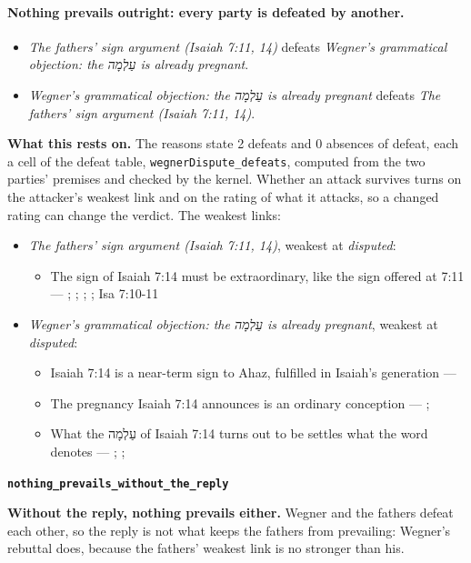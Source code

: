 \documentclass[11pt]{article}
\begin{document}
\paragraph{Nothing prevails outright: every party is defeated by another.}
\begin{itemize}
\item \emph{The fathers' sign argument (Isaiah 7:11, 14)} defeats \emph{Wegner's grammatical objection: the עַלְמָה is already pregnant}.
\item \emph{Wegner's grammatical objection: the עַלְמָה is already pregnant} defeats \emph{The fathers' sign argument (Isaiah 7:11, 14)}.
\end{itemize}
\par\noindent\textbf{What this rests on.} The reasons state 2 defeats and 0 absences of defeat, each a cell of the defeat table, \texttt{wegner\allowbreak{}Dispute\_\allowbreak{}defeats}, computed from the two parties' premises and checked by the kernel. Whether an attack survives turns on the attacker's weakest link and on the rating of what it attacks, so a changed rating can change the verdict. The weakest links:
\begin{itemize}
\item \emph{The fathers' sign argument (Isaiah 7:11, 14)}, weakest at \emph{disputed}:
\begin{itemize}
\item The sign of Isaiah 7:14 must be extraordinary, like the sign offered at 7:11 --- \cite[I.35]{origen-against-celsus-248}; \cite[84]{justin-dialogue-with-trypho-160}; \cite[III.21.6]{irenaeus-against-heresies-180}; \cite[474]{postell-isaiah-messianic-2025}; Isa 7:10-11
\end{itemize}
\item \emph{Wegner's grammatical objection: the עַלְמָה is already pregnant}, weakest at \emph{disputed}:
\begin{itemize}
\item Isaiah 7:14 is a near-term sign to Ahaz, fulfilled in Isaiah's generation --- \cite{brown-birth-messiah-1993}
\item The pregnancy Isaiah 7:14 announces is an ordinary conception --- \cite[476--478]{wegner-virgin-births-2011}; \cite[474]{postell-isaiah-messianic-2025}
\item What the עַלְמָה of Isaiah 7:14 turns out to be settles what the word denotes --- \cite[471--472]{wegner-virgin-births-2011}; \cite[468]{postell-isaiah-messianic-2025}; \cite[152]{rico-gentry-infant-king-2020}
\end{itemize}
\end{itemize}
\par\medskip\noindent\textbf{\texttt{nothing\_\allowbreak{}prevails\_\allowbreak{}without\_\allowbreak{}the\_\allowbreak{}reply}}\par\nobreak\noindent
\textbf{Without the reply, nothing prevails either.} Wegner and the fathers defeat each other, so the reply is not what keeps the fathers from prevailing: Wegner's rebuttal does, because the fathers' weakest link is no stronger than his.
\end{document}
